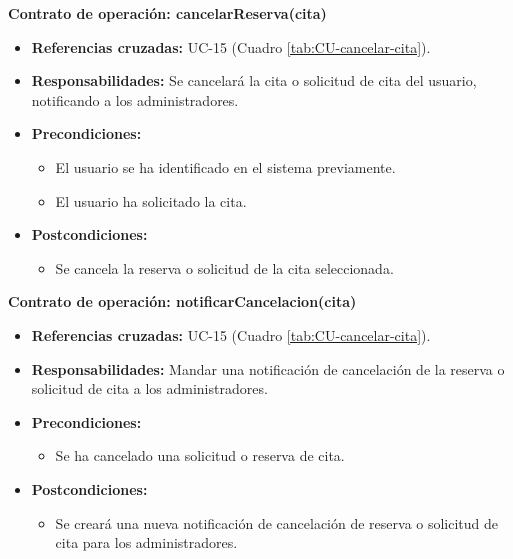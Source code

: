 \textbf{Contrato de operación: cancelarReserva(cita)}
\begin{itemize}
\item \textbf{Referencias cruzadas:} UC-15 (Cuadro \ref{tab:CU-cancelar-cita}).
\item \textbf{Responsabilidades:} Se cancelará la cita o solicitud de cita del usuario, notificando a los administradores.
\item \textbf{Precondiciones:} 
 \begin{itemize}
\item El usuario se ha identificado en el sistema previamente.
\item El usuario ha solicitado la cita.
\end {itemize}
\item \textbf{Postcondiciones:} 
 \begin{itemize}
\item Se cancela la reserva o solicitud de la cita seleccionada.
\end {itemize}
\end {itemize}

\textbf{Contrato de operación: notificarCancelacion(cita)}
\begin{itemize}
\item \textbf{Referencias cruzadas:} UC-15 (Cuadro \ref{tab:CU-cancelar-cita}).
\item \textbf{Responsabilidades:} Mandar una notificación de cancelación de la reserva o solicitud de cita a los administradores.
\item \textbf{Precondiciones:} 
 \begin{itemize}
\item Se ha cancelado una solicitud o reserva de cita.
\end {itemize}
\item \textbf{Postcondiciones:} 
 \begin{itemize}
\item Se creará una nueva notificación de cancelación de reserva o solicitud de cita para los administradores.
\end {itemize}
\end {itemize}

